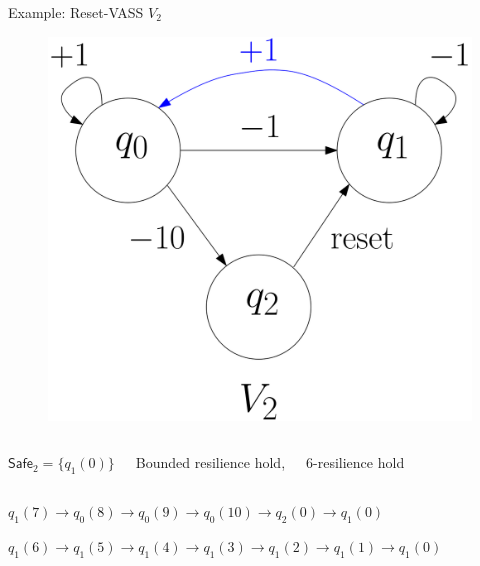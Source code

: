 \documentclass{beamer}
\newcommand{\Safe}{\textsf{Safe}}
\begin{document}
  \begin{frame}{Example: Reset-VASS $V_2$}
  
  
   \begin{center}
 	\begin{figure}
\includegraphics[width=.47\textwidth]{FigB}
	\end{figure}
\end{center}  

\begin{columns}[T]

$\Safe_2 = \{q_1(0)\} $

 
 Bounded resilience hold, 
 
 \vspace{0.1cm}
 
 \phantom{bla} $6$-resilience hold

\end{columns}

 \vspace{0.1cm}
 
$q_1(7) \to q_0(8) \to q_0(9) \to q_0(10) \to q_2(0) \to q_1(0)$

$q_1(6) \to q_1(5) \to q_1(4) \to q_1(3) \to q_1(2) \to q_1(1) \to q_1(0)$

  \end{frame}
\end{document}
